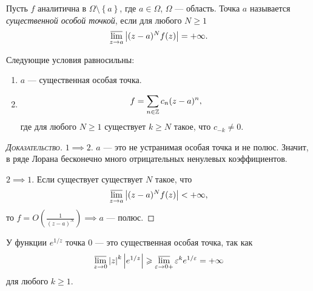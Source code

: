 \documentclass[../../main.tex]{subfiles}
\begin{document}
\begin{df}
 Пусть $ f $ аналитична в $ \Omega \setminus \left\{ a \right\} $, где $ a \in \Omega $, $ \Omega $ --- область. Точка $ a $ называется \textit{существенной особой точкой}, если для любого $ N \geqslant 1 $
 \begin{align*}
  \varlimsup_{z \to a} \left|(z-a)^{N}f(z) \right| = +\infty.
 \end{align*}
\end{df}
\begin{thm}
 Следующие условия равносильны:
 \begin{enumerate}
  \item $ a $ --- существенная особая точка.
  \item
   \begin{align*}
    f = \sum_{n \in \mathbb{Z}} c_n(z-a)^{n},
   \end{align*} где для любого $ N \geqslant 1 $ существует $ k \geqslant N $ такое, что $ c_{-k} \neq 0 $.
 \end{enumerate}
\end{thm}
\begin{proof}[\normalfont\textsc{Доказательство}]
 $ 1 \implies 2 $. $ a $ --- это не устранимая особая точка и не полюс. Значит, в ряде Лорана бесконечно много отрицательных ненулевых коэффициентов.

 $ 2 \implies 1 $. Если существует существует $ N $ такое, что
 \begin{align*}
  \varlimsup_{z \to a} \left| (z-a)^{N}f(z) \right| < +\infty,
 \end{align*} то $ f = O(\frac{1}{(z-a)^{N}}) \implies a $ --- полюс.
\end{proof}

\begin{exmpl}
 У функции $ e^{1 / z} $ точка $ 0 $ --- это существенная особая точка, так как
 \begin{align*}
  \varlimsup_{z \to 0} \left| z \right|^{k} \left| e^{1/z} \right| \geqslant \varlimsup_{\varepsilon \to 0+} \varepsilon^{k} e^{1 / \varepsilon} = +\infty
 \end{align*} для любого $ k \geqslant 1 $.
\end{exmpl}
\end{document}
